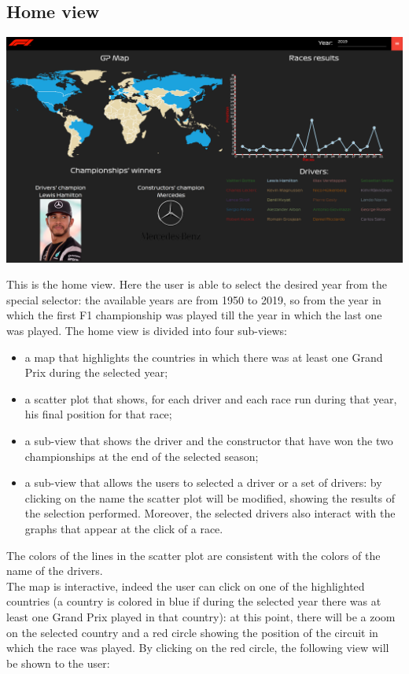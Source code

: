 \documentclass[11pt,twocolumn,letterpaper]{article}
\begin{document}
\subsection{Home view}
\begin{center}
	\centering
	\includegraphics[width=\columnwidth]{home}
\end{center}

This is the home view. Here the user is able to select the desired year from the special selector: the available years are from 1950 to 2019, so from the year in which the first F1 championship was played till the year in which the last one was played. The home view is divided into four sub-views:

\begin{itemize}
	\item a map that highlights the countries in which there was at least one Grand Prix during the selected year;
	\item a scatter plot that shows, for each driver and each race run during that year, his final position for that race;
	\item a sub-view that shows the driver and the constructor that have won the two championships at the end of the selected season;
	\item a sub-view that allows the users to selected a driver or a set of drivers: by clicking on the name the scatter plot will be modified, showing the results of the selection performed. Moreover, the selected drivers also interact with the graphs that appear at the click of a race.
\end{itemize}

The colors of the lines in the scatter plot are consistent with the colors of the name of the drivers.\\ 
The map is interactive, indeed the user can click on one of the highlighted countries (a country is colored in blue if during the selected year there was at least one Grand Prix played in that country): at this point, there will be a zoom on the selected country and a red circle showing the position of the circuit in which the race was played. By clicking on the red circle, the following view will be shown to the user:
\end{document}

